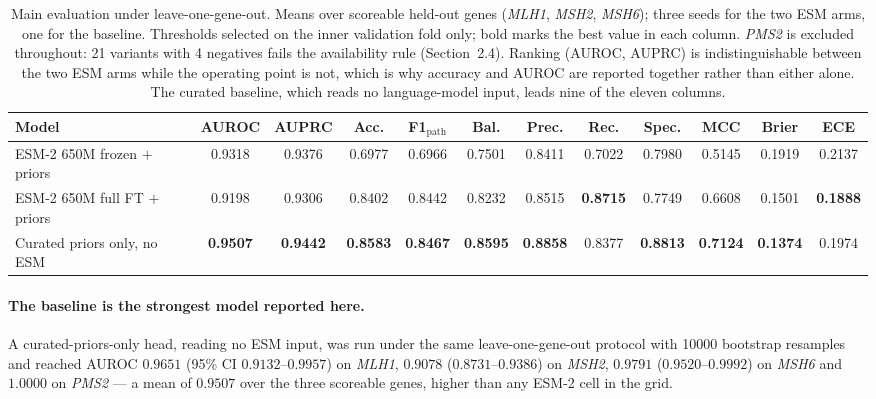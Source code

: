 \documentclass{bioinfo}
\newcommand{\gene}[1]{\textit{#1}}
\begin{document}
\begin{table}[t]
\caption{Main evaluation under leave-one-gene-out. Means over scoreable
held-out genes (\gene{MLH1}, \gene{MSH2}, \gene{MSH6}); three seeds for the two
ESM arms, one for the baseline. Thresholds selected on the inner validation
fold only; bold marks the best value in each column. \gene{PMS2} is excluded
throughout: 21 variants with 4 negatives fails the availability rule
(Section~2.4). Ranking (AUROC, AUPRC) is indistinguishable between the two ESM
arms while the operating point is not, which is why accuracy and AUROC are
reported together rather than either alone. The curated baseline, which reads
no language-model input, leads nine of the eleven columns.}
\label{tab:main}
\centering
\scriptsize
\setlength{\tabcolsep}{2.5pt}
\begin{tabularx}{\textwidth}{@{}>{\raggedright\arraybackslash}X*{11}{c}@{}}
\toprule
Model & AUROC & AUPRC & Acc. & F1$_\text{path}$ & Bal. & Prec. & Rec. & Spec. & MCC & Brier & ECE \\
\midrule
ESM-2 650M frozen $+$ priors    & 0.9318 & 0.9376 & 0.6977 & 0.6966 & 0.7501 & 0.8411 & 0.7022 & 0.7980 & 0.5145 & 0.1919 & 0.2137 \\
ESM-2 650M full FT $+$ priors   & 0.9198 & 0.9306 & 0.8402 & 0.8442 & 0.8232 & 0.8515 & \textbf{0.8715} & 0.7749 & 0.6608 & 0.1501 & \textbf{0.1888} \\
Curated priors only, no ESM     & \textbf{0.9507} & \textbf{0.9442} & \textbf{0.8583} & \textbf{0.8467} & \textbf{0.8595} & \textbf{0.8858} & 0.8377 & \textbf{0.8813} & \textbf{0.7124} & \textbf{0.1374} & 0.1974 \\
\bottomrule
\end{tabularx}
\end{table}

\paragraph{The baseline is the strongest model reported here.}
A curated-priors-only head, reading no ESM input, was run under the same
leave-one-gene-out protocol with \num{10000} bootstrap resamples and reached
AUROC $0.9651$ (95\% CI $0.9132$--$0.9957$) on \gene{MLH1}, $0.9078$
($0.8731$--$0.9386$) on \gene{MSH2}, $0.9791$ ($0.9520$--$0.9992$) on
\gene{MSH6} and $1.0000$ on \gene{PMS2} --- a mean of $0.9507$ over the three
scoreable genes, higher than any ESM-2 cell in the grid.
\end{document}

